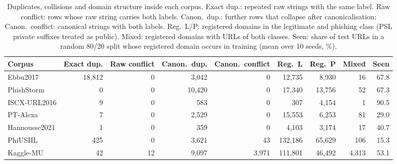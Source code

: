 \begin{table}[tp]
\centering
\caption{Duplicates, collisions and domain structure inside each corpus. Exact dup.: repeated raw strings with the same label. Raw conflict: rows whose raw string carries both labels. Canon.\ dup.: further rows that collapse after canonicalisation; Canon.\ conflict: canonical strings with both labels. Reg.\ L/P: registered domains in the legitimate and phishing class (PSL private suffixes treated as public). Mixed: registered domains with URLs of both classes. Seen: share of test URLs in a random 80/20 split whose registered domain occurs in training (mean over 10 seeds, \%).}
\label{tab:overlap}
\footnotesize
\begin{adjustbox}{max width=\linewidth}
\begin{tabular}{@{}lrrrrrrrr@{}}
\toprule
Corpus & Exact dup. & Raw conflict & Canon.\ dup. & Canon.\ conflict & Reg.\ L & Reg.\ P & Mixed & Seen \\
\midrule
Ebbu2017 & 18,812 & 0 & 3,042 & 0 & 12,735 & 8,930 & 16 & 67.8 \\
PhishStorm & 0 & 0 & 10,420 & 0 & 17,340 & 13,756 & 52 & 67.3 \\
ISCX-URL2016 & 9 & 0 & 583 & 0 & 307 & 4,154 & 1 & 90.5 \\
PT-Alexa & 7 & 0 & 2,529 & 0 & 15,553 & 6,253 & 81 & 29.0 \\
Hannousse2021 & 1 & 0 & 359 & 0 & 4,103 & 3,174 & 17 & 40.7 \\
PhiUSIIL & 425 & 0 & 3,621 & 43 & 132,186 & 65,629 & 106 & 15.3 \\
Kaggle-MU & 42 & 12 & 9,097 & 3,971 & 111,801 & 46,492 & 4,313 & 53.1 \\
\bottomrule
\end{tabular}
\end{adjustbox}
\end{table}

